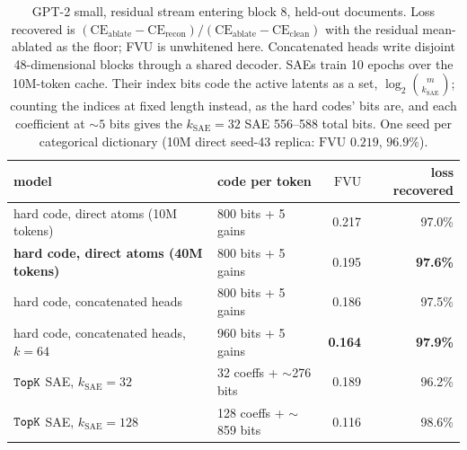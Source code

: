 \begin{table}[tp]\centering\small
\begin{tabular}{@{}llrr@{}}
\toprule
model & code per token & $\mathrm{FVU}$ & loss recovered \\
\midrule
hard code, direct atoms (10M tokens) & 800 bits + 5 gains & 0.217 & 97.0\% \\
\textbf{hard code, direct atoms (40M tokens)} & 800 bits + 5 gains & 0.195 & \textbf{97.6\%} \\
hard code, concatenated heads & 800 bits + 5 gains & 0.186 & 97.5\% \\
hard code, concatenated heads, $k{=}64$ & 960 bits + 5 gains & \textbf{0.164} & \textbf{97.9\%} \\
$\mathop{\mathtt{TopK}}\limits$ SAE, $k_{\mathrm{SAE}}{=}32$ & 32 coeffs + $\sim$276 bits & 0.189 & 96.2\% \\
$\mathop{\mathtt{TopK}}\limits$ SAE, $k_{\mathrm{SAE}}{=}128$ & 128 coeffs + $\sim$859 bits & 0.116 & 98.6\% \\
\bottomrule
\end{tabular}
\caption{GPT-2 small, residual stream entering block 8, held-out
documents. Loss recovered is
$(\mathrm{CE}_{\mathrm{ablate}} - \mathrm{CE}_{\mathrm{recon}}) /
(\mathrm{CE}_{\mathrm{ablate}} - \mathrm{CE}_{\mathrm{clean}})$ with the
residual mean-ablated as the floor; FVU is unwhitened here. Concatenated
heads write disjoint 48-dimensional blocks through a shared decoder. SAEs
train 10 epochs over the 10M-token cache. Their index bits code the
active latents as a set, $\log_2\binom{m}{k_{\mathrm{SAE}}}$; counting
the indices at fixed length instead, as the hard codes' bits are, and
each coefficient at ${\sim}5$ bits gives the $k_{\mathrm{SAE}}{=}32$ SAE
556--588 total bits. One seed per
categorical dictionary (10M direct seed-43 replica: $\mathrm{FVU}$
$0.219$, $96.9\%$).}
\label{tab:prelim-gpt2}
\end{table}

